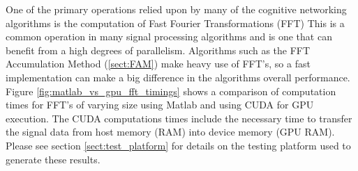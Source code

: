 One of the primary operations relied upon by many of the cognitive networking algorithms is the computation of Fast Fourier Transformations (FFT)  This is a common operation in many signal processing algorithms and is one that can benefit from a high degrees of parallelism.  Algorithms such as the FFT Accumulation Method (\ref{sect:FAM}) make heavy use of FFT's, so a fast implementation can make a big difference in the algorithms overall performance.  Figure \ref{fig:matlab_vs_gpu_fft_timings} shows a comparison of computation times for FFT's of varying size using Matlab and using CUDA for GPU execution.  The CUDA computations times include the necessary time to transfer the signal data from host memory (RAM) into device memory (GPU RAM).  Please see section \ref{sect:test_platform} for details on the testing platform used to generate these results.

